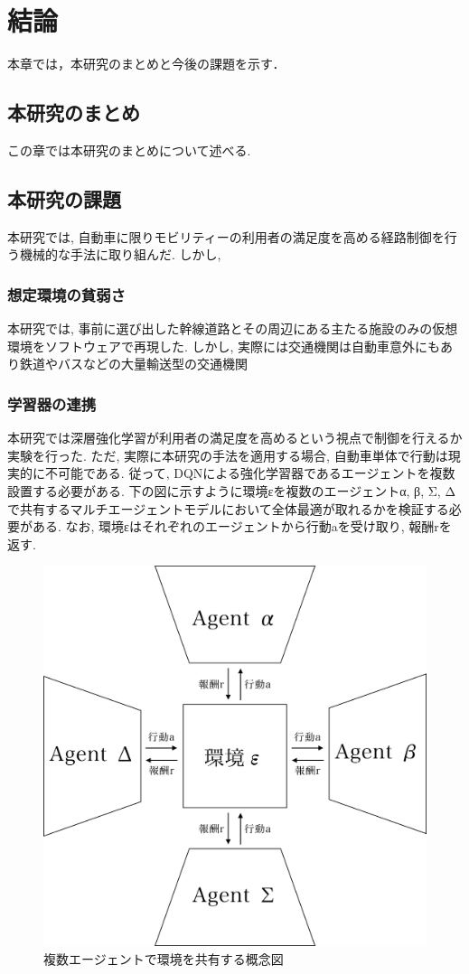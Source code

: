 \chapter{結論}
\label{conclusion}

本章では，本研究のまとめと今後の課題を示す．

\section{本研究のまとめ}

この章では本研究のまとめについて述べる.

\section{本研究の課題}

本研究では, 自動車に限りモビリティーの利用者の満足度を高める経路制御を行う機械的な手法に取り組んだ.
しかし,

\subsection{想定環境の貧弱さ}

本研究では, 事前に選び出した幹線道路とその周辺にある主たる施設のみの仮想環境をソフトウェアで再現した. 
しかし, 実際には交通機関は自動車意外にもあり鉄道やバスなどの大量輸送型の交通機関

\subsection{学習器の連携}

本研究では深層強化学習が利用者の満足度を高めるという視点で制御を行えるか実験を行った.
ただ, 実際に本研究の手法を適用する場合, 自動車単体で行動は現実的に不可能である.
従って, DQNによる強化学習器であるエージェントを複数設置する必要がある. 下の図に示すように環境εを複数のエージェントα, β, Σ, Δで共有するマルチエージェントモデルにおいて全体最適が取れるかを検証する必要がある.
なお, 環境εはそれぞれのエージェントから行動aを受け取り, 報酬rを返す.



\begin{figure}[H]
    \centering
    \includegraphics[clip,width = 12.0cm]{assets/multiagent_shared_env.eps}
    \caption{複数エージェントで環境を共有する概念図}  \label{sample}
\end{figure}

